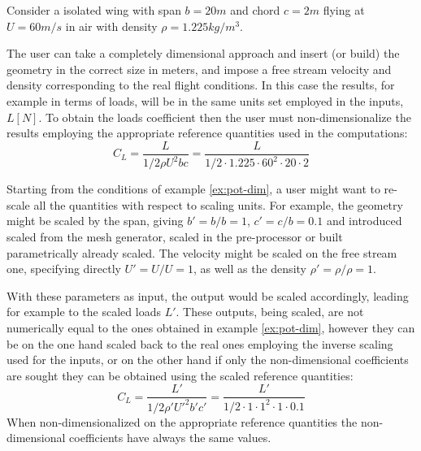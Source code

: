 \begin{example}
\label{ex:pot-dim}
Consider a isolated wing with span $b = 20 m$ and chord $c = 2 m$ flying at 
$U = 60 m/s$ in air with density $\rho = 1.225 kg/m^3$. 

The user can take a completely dimensional approach and insert (or build) 
the geometry in the correct size in meters, and impose a free stream velocity 
and density corresponding to the real flight conditions. In this case the results, 
for example in terms of loads, will be in the same units set employed in the inputs, 
$L [N]$. To obtain the loads coefficient then the user must non-dimensionalize the 
results employing the appropriate reference quantities used in the computations:
\begin{equation*}
    C_L = \frac{L}{1/2 \rho U^2 b c} = \frac{L}{1/2 \cdot 1.225  \cdot 60^2 \cdot 20 \cdot 2}
\end{equation*}
\end{example}

\begin{example}
\label{ex:pot-nondim}
Starting from the conditions of example \ref{ex:pot-dim}, a user might want 
to re-scale all the quantities with respect to scaling units. For example, 
the geometry might be scaled by the span, giving $b' = b/b = 1$, $c'=c/b=0.1$ 
and introduced scaled from the mesh generator, scaled in the pre-processor or 
built parametrically already scaled. The velocity might be scaled on the free 
stream one, specifying directly $U'=U/U=1$, as well as the density $\rho' = \rho/\rho = 1$. 

With these parameters as input, the output would be scaled accordingly, 
leading for example to the scaled loads $L'$. These outputs, being scaled, 
are not numerically equal to the ones obtained in example \ref{ex:pot-dim}, 
however they can be on the one hand scaled back to the real ones employing 
the inverse scaling used for the inputs, or on the other hand if only the 
non-dimensional coefficients are sought they can be obtained using the scaled 
reference quantities:
\begin{equation*}
    C_L = \frac{L'}{1/2 \rho' U'^2 b' c'} = \frac{L'}{1/2 \cdot 1  \cdot 1^2 \cdot 1 \cdot 0.1}
\end{equation*}
When non-dimensionalized on the appropriate reference quantities the 
non-dimensional coefficients have always the same values.
\end{example}

